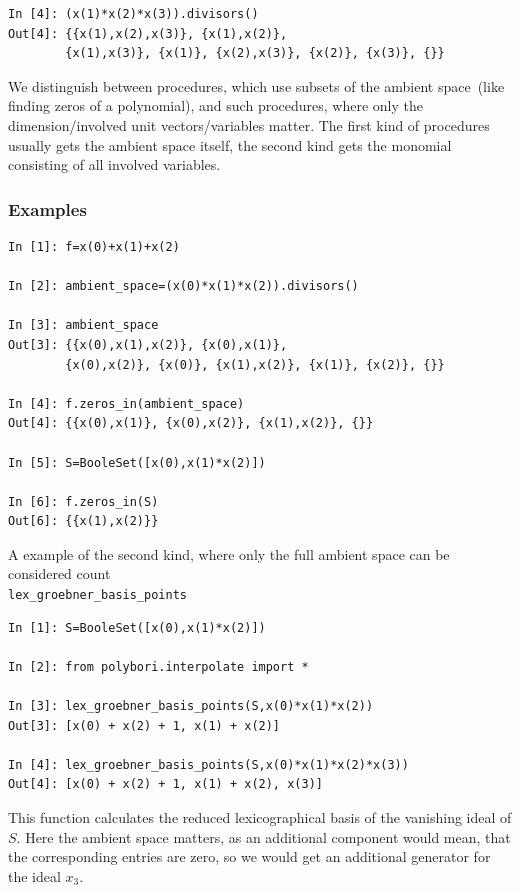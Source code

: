 \begin{lstlisting}
In [4]: (x(1)*x(2)*x(3)).divisors()
Out[4]: {{x(1),x(2),x(3)}, {x(1),x(2)}, 
        {x(1),x(3)}, {x(1)}, {x(2),x(3)}, {x(2)}, {x(3)}, {}}
\end{lstlisting}

We distinguish between procedures, which use subsets of the ambient space~(like
finding zeros of a polynomial),  and such procedures, where
only the dimension/involved unit vectors/variables matter.
The first kind of procedures usually gets the ambient space itself, the second kind gets the monomial consisting of all involved variables.

\subsubsection{Examples}
\begin{lstlisting}
In [1]: f=x(0)+x(1)+x(2)

In [2]: ambient_space=(x(0)*x(1)*x(2)).divisors()

In [3]: ambient_space
Out[3]: {{x(0),x(1),x(2)}, {x(0),x(1)}, 
        {x(0),x(2)}, {x(0)}, {x(1),x(2)}, {x(1)}, {x(2)}, {}}

In [4]: f.zeros_in(ambient_space)
Out[4]: {{x(0),x(1)}, {x(0),x(2)}, {x(1),x(2)}, {}}

In [5]: S=BooleSet([x(0),x(1)*x(2)])

In [6]: f.zeros_in(S)
Out[6]: {{x(1),x(2)}}
\end{lstlisting}

A example of the second kind, where only the full ambient space can be considered count\\
\lstinline|lex_groebner_basis_points|
\begin{lstlisting}
In [1]: S=BooleSet([x(0),x(1)*x(2)])

In [2]: from polybori.interpolate import *              

In [3]: lex_groebner_basis_points(S,x(0)*x(1)*x(2))
Out[3]: [x(0) + x(2) + 1, x(1) + x(2)]

In [4]: lex_groebner_basis_points(S,x(0)*x(1)*x(2)*x(3))
Out[4]: [x(0) + x(2) + 1, x(1) + x(2), x(3)]
\end{lstlisting}

This function calculates the reduced lexicographical \Groebner basis of the vanishing ideal of $S$.
Here the ambient space matters, as an additional component would mean, that the corresponding entries are zero, so we would get an additional generator for the ideal $x_3$.

